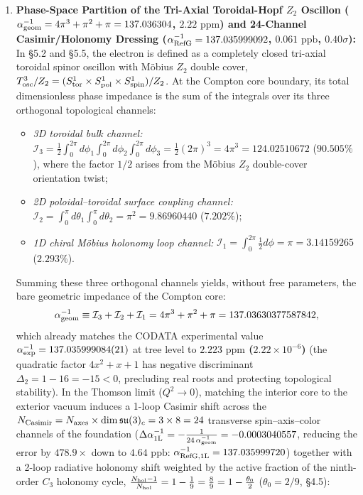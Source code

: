 \documentclass[11pt,a4paper]{article}
\begin{document}
\begin{enumerate}[label=\arabic*.]
\item \textbf{Phase-Space Partition of the Tri-Axial Toroidal-Hopf $Z_2$ Oscillon ($\alpha_{\rm geom}^{-1} = 4\pi^3 + \pi^2 + \pi = 137.036304$, $2.22\text{ ppm}$) and 24-Channel Casimir/Holonomy Dressing ($\alpha_{\rm RefG}^{-1} = 137.035999092$, $0.061\text{ ppb}$, $0.40\sigma$):} In \S 5.2 and \S 5.5, the electron is defined as a completely closed tri-axial toroidal spinor oscillon with Möbius $Z_2$ double cover, $T^3_{\rm osc}/Z_2 = (S^1_{\rm tor}\times S^1_{\rm pol}\times S^1_{\rm spin})/Z_2$. At the Compton core boundary, its total dimensionless phase impedance is the sum of the integrals over its three orthogonal topological channels:
\begin{itemize}
\item \emph{3D toroidal bulk channel:} $\mathcal{I}_3 = \frac{1}{2}\int_0^{2\pi}d\phi_1\int_0^{2\pi}d\phi_2\int_0^{2\pi}d\phi_3 = \frac{1}{2}(2\pi)^3 = 4\pi^3 = 124.02510672$ ($90.505\%$), where the factor $1/2$ arises from the Möbius $Z_2$ double-cover orientation twist;
\item \emph{2D poloidal--toroidal surface coupling channel:} $\mathcal{I}_2 = \int_0^\pi d\theta_1\int_0^\pi d\theta_2 = \pi^2 = 9.86960440$ ($7.202\%$);
\item \emph{1D chiral Möbius holonomy loop channel:} $\mathcal{I}_1 = \int_0^{2\pi}\frac{1}{2}d\phi = \pi = 3.14159265$ ($2.293\%$).
\end{itemize}
Summing these three orthogonal channels yields, without free parameters, the bare geometric impedance of the Compton core:
\begin{equation}
\alpha_{\rm geom}^{-1} \equiv \mathcal{I}_3 + \mathcal{I}_2 + \mathcal{I}_1 = 4\pi^3 + \pi^2 + \pi = 137.03630377587842,
\end{equation}
which already matches the CODATA experimental value $\alpha_{\rm exp}^{-1} = 137.035999084(21)$ at tree level to \textbf{$2.223\text{ ppm}$ ($2.22\times 10^{-6}$)} (the quadratic factor $4x^2 + x + 1$ has negative discriminant $\Delta_2 = 1 - 16 = -15 < 0$, precluding real roots and protecting topological stability). In the Thomson limit ($Q^2 \to 0$), matching the interior core to the exterior vacuum induces a 1-loop Casimir shift across the $N_{\rm Casimir} = N_{\rm axes}\times\dim\mathfrak{su}(3)_c = 3\times 8 = 24$ transverse spin--axis--color channels of the foundation ($\Delta\alpha_{1\rm L}^{-1} = -\frac{1}{24\,\alpha_{\rm geom}^{-1}} = -0.0003040557$, reducing the error by $478.9\times$ down to $4.64\text{ ppb}$: $\alpha_{\rm RefG,1L}^{-1} = 137.035999720$) together with a 2-loop radiative holonomy shift weighted by the active fraction of the ninth-order $C_3$ holonomy cycle, $\frac{N_{\rm hol}-1}{N_{\rm hol}} = 1 - \frac{1}{9} = \frac{8}{9} = 1 - \frac{\theta_0}{2}$ ($\theta_0 = 2/9$, \S 4.5):

\end{enumerate}
\end{document}
